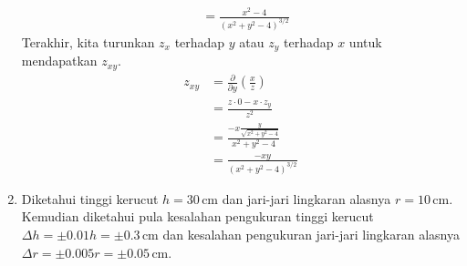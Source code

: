 \documentclass[11pt,a4paper]{article}
\begin{document}
\begin{enumerate}
\begin{align*}
                 & = \frac{x^2 - 4}{(x^2 + y^2 - 4)^{3/2}}
        \end{align*}
        Terakhir, kita turunkan $z_x$ terhadap $y$ atau $z_y$ terhadap $x$ untuk mendapatkan $z_{xy}$.
        \begin{align*}
          z_{xy} & = \frac{\partial}{\partial y}\left(\frac{x}{z}\right)      \\
                 & = \frac{z \cdot 0 - x \cdot z_y}{z^2}                      \\
                 & = \frac{- x \frac{y}{\sqrt{x^2 + y^2 - 4}}}{x^2 + y^2 - 4} \\
                 & = \frac{-xy}{(x^2 + y^2 - 4)^{3/2}}
        \end{align*}

  \item Diketahui tinggi kerucut $h = 30\,\text{cm}$ dan jari-jari lingkaran alasnya $r = 10\,\text{cm}$. Kemudian diketahui pula kesalahan pengukuran tinggi kerucut $\Delta h = \pm 0.01h = \pm 0.3\,\text{cm}$ dan kesalahan pengukuran jari-jari lingkaran alasnya $\Delta r = \pm 0.005r = \pm 0.05\,\text{cm}$.
\end{enumerate}
\end{document}

